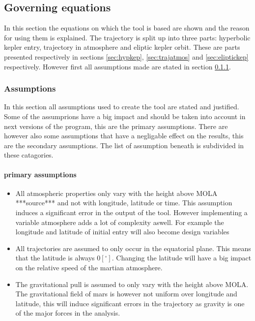 \subsection{Governing equations}
\label{sec:astrogov}
In this section the equations on which the tool is based are shown and the reason for using them is explained. The trajectory is split up into three parts: hyperbolic kepler entry, trajectory in atmosphere and eliptic kepler orbit. These are parts presented respectively in sections \ref{sec:hypkep}, \ref{sec:trajatmos} and \ref{sec:eliptickep} respectively. However first all assumptions made are stated in section \ref{sec:astroassumption}.

\subsubsection{Assumptions}
 \label{sec:astroassumption}
 In this section all assumptions used to create the tool are stated and justified. Some of the assumprions have a big impact and should be taken into account in next versions of the program, this are the primary assumptions. There are however also some assumptions that have a negligable effect on the results, this are the secondary assumptions. The list of assumption beneath is subdivided in these catagories.
 
 \paragraph{primary assumptions}
 \begin{itemize}
 \item All atmospheric properties only vary with the height above MOLA ***source*** and not with longitude, latitude or time. This assumption induces a significant error in the output of the tool. However implementing a variable atmosphere adds a lot of complexity aswell. For example the longitude and latitude of initial entry will also become design variables
 \item All trajectories are assumed to only occur in the equatorial plane. This means that the latitude is always $0 \left[^\circ\right]$. Changing the latitude will have a big impact on the relative speed of the martian atmosphere.
 \item The gravitational pull is assumed to only vary with the height above MOLA. The gravitational field of mars is however not uniform over longitude and latitude, this will induce significant errors in the trajectory as gravity is one of the major forces in the analysis.
 \end{itemize}
 
